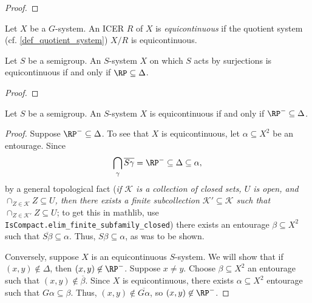 \begin{proof}
\end{proof}


\begin{definition}
\leanok{}
    Let $X$ be a $G$-system.  An ICER $R$ of $X$ is \emph{equicontinuous} if the quotient system (cf. \cref{def_quotient_system}) $X/R$ is equicontinuous.
\end{definition}

\begin{lemma}
    \label{lemma_rp_and_equicontinuity}
    \leanok{}
    Let $S$ be a semigroup. An $S$-system $X$ on which $S$ acts by surjections is equicontinuous if and only if $\RP \subseteq \Delta$.
\end{lemma}

\begin{proof}
\end{proof}

\begin{lemma}
    \label{lemma_rp_and_equicontinuity}
    \leanok{}
    Let $S$ be a semigroup. An $S$-system $X$ is equicontinuous if and only if $\RP^- \subseteq \Delta$.
\end{lemma}

\begin{proof}
\leanok{}
    Suppose $\RP^- \subseteq \Delta$.  To see that $X$ is equicontinuous, let $\alpha \subseteq X^2$ be an entourage.  Since
    \[
        \bigcap_{\gamma} \overline{S \gamma} = \RP^- \subseteq \Delta \subseteq \alpha,
    \]
    by a general topological fact (\emph{if $\mathcal{K}$ is a collection of closed sets, $U$ is open, and $\cap_{Z \in \mathcal{K}} Z \subseteq U$, then there exists a finite subcollection $\mathcal{K}' \subseteq \mathcal{K}$ such that $\cap_{Z \in \mathcal{K}'} Z \subseteq U$}; to get this in mathlib, use \verb|IsCompact.elim_finite_subfamily_closed|) there exists an entourage $\beta \subseteq X^2$ such that $\overline{S \beta} \subseteq \alpha$.  Thus, $S \beta \subseteq \alpha$, as was to be shown.

    Conversely, suppose $X$ is an equicontinuous $S$-system.
    We will show that if $(x,y) \not\in \Delta$, then $(x,y) \not\in \RP^-$. Suppose $x \neq y$.  Choose $\beta \subseteq X^2$ an entourage such that $(x,y) \not\in \overline{\beta}$.  Since $X$ is equicontinuous, there exists $\alpha \subseteq X^2$ entourage such that $G \alpha \subseteq \beta$.  Thus, $(x,y) \not\in \overline{G \alpha}$, so $(x,y) \not\in \RP^-$.
\end{proof}

